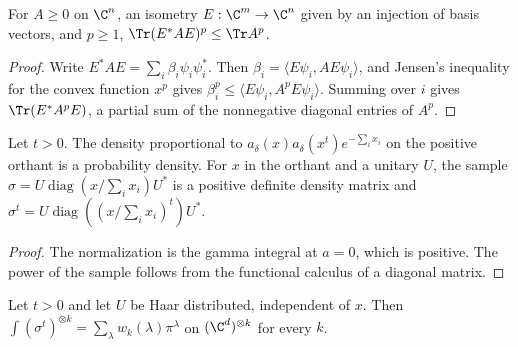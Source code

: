 \begin{lemma}
    \label{lem:trace_compression}
    \leanok
    For $A\ge0$ on $\C^n$, an isometry $E:\C^m\to\C^n$ given by an injection of basis
    vectors, and $p\ge1$, $\Tr(E^\ast AE)^p\le\Tr A^p$.
\end{lemma}

\begin{proof}\leanok
    Write $E^\ast AE=\sum_i\beta_i\psi_i\psi_i^\ast$. Then
    $\beta_i=\langle E\psi_i,AE\psi_i\rangle$, and Jensen's inequality for the convex function
    $x^p$ gives $\beta_i^p\le\langle E\psi_i,A^pE\psi_i\rangle$. Summing over $i$ gives
    $\Tr(E^\ast A^pE)$, a partial sum of the nonnegative diagonal entries of $A^p$.
\end{proof}

\begin{lemma}
    \label{lem:spectral_law}
    \leanok
    Let $t>0$. The density proportional to $a_\delta(x)a_\delta(x^t)e^{-\sum_ix_i}$ on the
    positive orthant is a probability density. For $x$ in the orthant and a unitary $U$, the
    sample $\sigma=U\operatorname{diag}(x/\sum_ix_i)U^\ast$ is a positive definite density
    matrix and $\sigma^t=U\operatorname{diag}((x/\sum_ix_i)^t)U^\ast$.
\end{lemma}

\begin{proof}\leanok
    The normalization is the gamma integral at $a=0$, which is positive. The power of the
    sample follows from the functional calculus of a diagonal matrix.
\end{proof}

\begin{theorem}
    \label{thm:replica_full_integral}
    \leanok
    Let $t>0$ and let $U$ be Haar distributed, independent of $x$. Then
    $\int(\sigma^t)^{\otimes k}=\sum_\lambda w_k(\lambda)\pi^\lambda$ on $(\C^d)^{\otimes k}$
    for every $k$.
\end{theorem}

